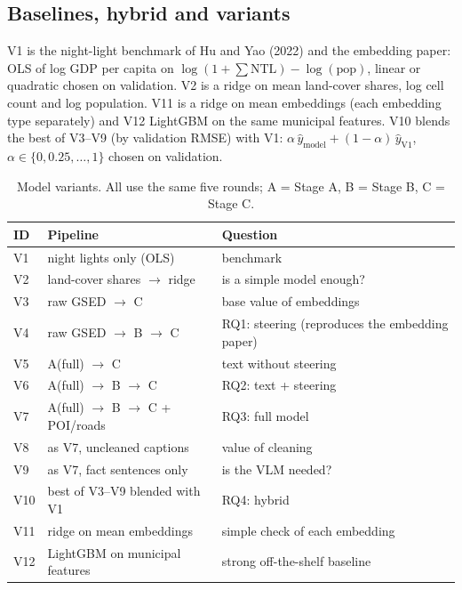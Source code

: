 \documentclass[11pt,a4paper]{article}
\begin{document}
\subsection{Baselines, hybrid and variants}
V1 is the night-light benchmark of Hu and Yao (2022) and the embedding paper: OLS of log GDP per capita on
$\log(1+\sum\text{NTL})-\log(\text{pop})$, linear or quadratic chosen on validation. V2 is a ridge on mean land-cover
shares, log cell count and log population. V11 is a ridge on mean embeddings (each embedding type separately) and V12
LightGBM on the same municipal features. V10 blends the best of V3--V9 (by validation RMSE) with V1:
$\alpha\,\hat y_{\text{model}}+(1-\alpha)\,\hat y_{\text{V1}}$, $\alpha\in\{0,0.25,\ldots,1\}$ chosen on validation.

\begin{table}[!htbp]
\centering\small
\caption{Model variants. All use the same five rounds; A = Stage A, B = Stage B, C = Stage C.}
\label{tab:variants}
\begin{tabularx}{\linewidth}{@{}l l L@{}}
\toprule
ID & Pipeline & Question \\
\midrule
V1 & night lights only (OLS) & benchmark \\
V2 & land-cover shares $\to$ ridge & is a simple model enough? \\
V3 & raw GSED $\to$ C & base value of embeddings \\
V4 & raw GSED $\to$ B $\to$ C & RQ1: steering (reproduces the embedding paper) \\
V5 & A(full) $\to$ C & text without steering \\
V6 & A(full) $\to$ B $\to$ C & RQ2: text + steering \\
V7 & A(full) $\to$ B $\to$ C + POI/roads & RQ3: full model \\
V8 & as V7, uncleaned captions & value of cleaning \\
V9 & as V7, fact sentences only & is the VLM needed? \\
V10 & best of V3--V9 blended with V1 & RQ4: hybrid \\
V11 & ridge on mean embeddings & simple check of each embedding \\
V12 & LightGBM on municipal features & strong off-the-shelf baseline \\
\bottomrule
\end{tabularx}
\end{table}
\end{document}
